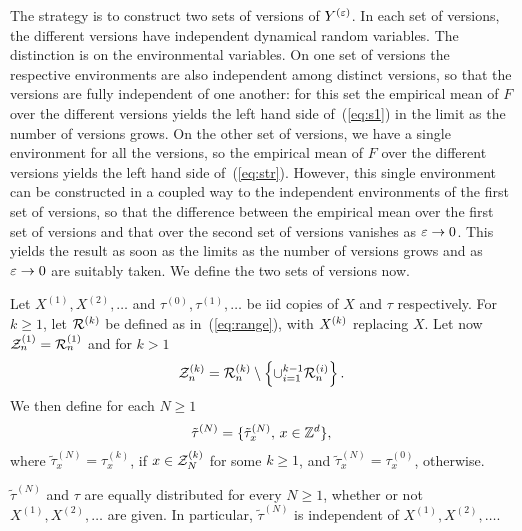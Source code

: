 The strategy is to construct two sets of versions of $Y^{(\varepsilon)}$. In each set of versions,
the different versions have independent dynamical random variables. The distinction is on the
environmental variables. On one set of versions the respective environments are also independent
among distinct versions, 
so that the versions are fully independent of one another: for this set the empirical 
mean of $F$ over the different versions yields the left hand side of~(\ref{eq:s1}) in the 
limit as the number of versions grows. 
On the other set of versions, we have a single environment for all the versions, so the empirical 
mean of $F$ over the different versions yields the left hand side of~(\ref{eq:str}).
However, this single environment 
can be constructed in a coupled way to the independent environments of the 
first set of versions, %
so that the difference between
the empirical mean over the first set of versions and that over the second set of versions
vanishes as $\varepsilon\to0$. This yields the result as soon as the limits as the number of versions
grows and as $\varepsilon\to0$ are suitably taken.
We define the two sets of versions now.

Let
$X^{(1)},X^{(2)},\ldots$ and $\tau^{(0)},\tau^{(1)},\ldots$ be
iid copies of $X$ and $\tau$ respectively. 
For $k\geq1$, let ${\cal R}^{(k)}$ 
be defined as in~(\ref{eq:range}),
with $X^{(k)}$ replacing $X$.
Let now ${\cal Z}^{(1)}_n={\cal R}^{(1)}_n$ and for $k>1$  
\begin{equation}
\label{eq:zz}
\ZZ^{(k)}_n=\RR^{(k)}_n\setminus\left\{\cup_{i=1}^{k-1}\RR^{(i)}_n\right\}.
\end{equation}
We then define for each $N\geq1$
\begin{equation}
\label{eq:ttau} 
\tilde\tau^{(N)}=\{\tilde\tau_x^{(N)},\,x\in\Z^d\},
\end{equation}
where $\tilde\tau_x^{(N)}=\tau^{(k)}_x$, if $x\in{\cal Z}^{(k)}_N$ for some $k\geq1$, 
and $\tilde\tau_x^{(N)}=\tau^{(0)}_x$, otherwise. 

\begin{rmk}
 \label{rmk:tt}
$\tilde\tau^{(N)}$ and $\tau$ are equally distributed for every  $N\geq1$, whether or not $X^{(1)},X^{(2)},\ldots$ 
are given. 
In particular, $\tilde\tau^{(N)}$ is independent of $X^{(1)},X^{(2)},\ldots$.
\end{rmk}

